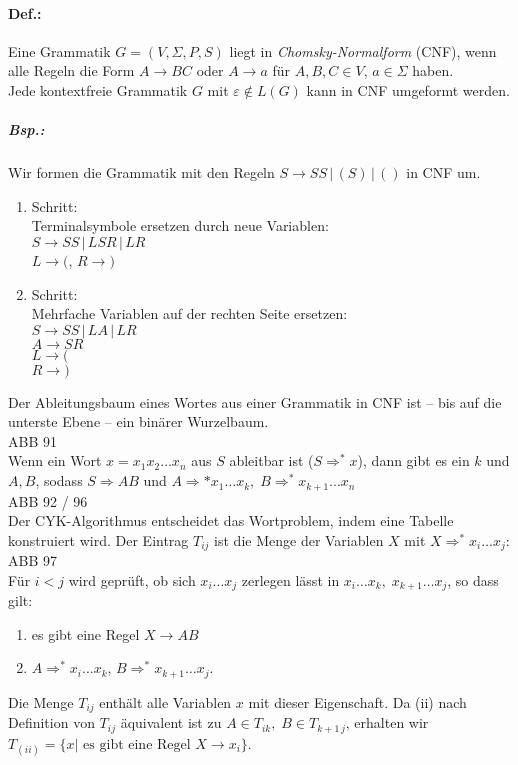 \paragraph{Def.:} Eine Grammatik $G=(V,\Sigma, P, S)$ liegt in \emph{Chomsky-Normalform} (CNF), wenn alle Regeln die Form $A\to BC$ oder $A\to a$ für $A,B,C \in V$, $a \in \Sigma$ haben.\\
Jede kontextfreie Grammatik $G$ mit $\varepsilon \not \in L(G)$ kann in CNF umgeformt werden.
\subparagraph{Bsp.:} Wir formen die Grammatik  mit den Regeln $S\to SS \,|\, (S) \,|\, ()$ in CNF um.
\begin{enumerate}[label=\arabic*.]
\item Schritt:\\
Terminalsymbole ersetzen durch neue Variablen: \\
$S\to SS \,|\, LSR \,|\, LR$\\
$L\to ($, $R \to )$
\item Schritt:\\
Mehrfache Variablen auf der rechten Seite ersetzen:\\
$S\to SS \,|\, LA \,|\, LR$\\
$A \to SR$\\
$L\to ($\\
$R\to )$
\end{enumerate}
Der Ableitungsbaum eines Wortes aus einer Grammatik in CNF ist -- bis auf die unterste Ebene -- ein binärer Wurzelbaum.\\
ABB 91\\
Wenn ein Wort $x=x_1x_2\dots x_n$ aus $S$ ableitbar ist ($S\Rightarrow^*x$), dann gibt es ein $ k $ und $ A,B $, sodass $ S\Rightarrow AB $ und $ A \Rightarrow* x_1\dots x_k , \; B\Rightarrow^*x_{k+1}...x_n $\\
ABB 92 / 96\\
Der CYK-Algorithmus entscheidet das Wortproblem, indem eine Tabelle konstruiert wird. Der Eintrag $T_{ij}$ ist die Menge der Variablen $X$ mit $X\Rightarrow^* x_i \dots x_j$:\\
ABB 97\\
Für $i<j$ wird geprüft, ob sich $x_i\dots x_j$ zerlegen lässt in $x_i\dots x_k,\; x_{k+1} \dots x_j$, so dass gilt:
\begin{enumerate} [label=(\roman*)]
\item es gibt eine Regel $X\to AB$
\item $A\Rightarrow^* x_i \dots x_k$, $B\Rightarrow^* x_{k+1}\dots x_j$.
\end{enumerate} 
Die Menge $T_{ij}$ enthält alle Variablen $x$ mit dieser Eigenschaft. Da (ii) nach Definition von $T_{ij}$ äquivalent ist zu $A \in T_{ik}, \; B\in T_{k+1\,j}$, erhalten wir $T_{(ii)}=\{x| \text{ es gibt eine Regel }X\to x_i\}$.\\

